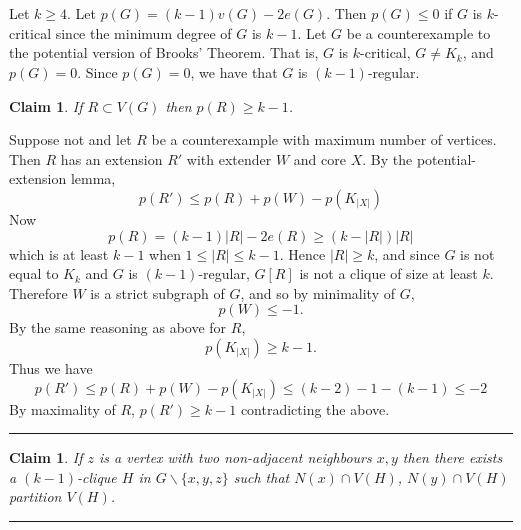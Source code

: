 \documentclass[letterpaper,12pt,oneside,onecolumn]{article}
\newenvironment{proof}{{\bf Proof:  }}{\hfill\rule{2mm}{2mm}}
\newtheorem{claim}[fact]{Claim}
\begin{document}
\section{}
\paragraph{}
Let $k \geq 4$. Let $p(G) = (k-1)v(G) - 2e(G)$. Then $p(G) \leq 0$ if $G$ is $k$-critical since the minimum degree of $G$ is $k-1$. Let $G$ be a counterexample to the potential version of Brooks' Theorem. That is, $G$ is $k$-critical, $G\neq K_k$, and $p(G) = 0$. Since $p(G) = 0$, we have that $G$ is $(k-1)$-regular.
\begin{claim}
If $R \subset V(G)$ then $p(R) \geq k-1$.
\end{claim}
\begin{proof}
Suppose not and let $R$ be a counterexample with maximum number of vertices. Then $R$ has an extension $R'$ with extender $W$ and core $X$. By the potential-extension lemma,
$$p(R') \leq p(R) + p(W) - p(K_{|X|})$$
Now $$p(R) =  (k-1)|R| - 2e(R) \geq (k-|R|)|R|$$
which is at least $k-1$ when $1 \leq |R| \leq k-1$. Hence $|R| \geq k$, and since $G$ is not equal to $K_k$ and $G$ is $(k-1)$-regular, $G[R]$ is not a clique of size at least $k$. Therefore $W$ is a strict subgraph of $G$, and so by minimality of $G$,
$$p(W) \leq -1.$$
By the same reasoning as above for $R$, $$p(K_{|X|}) \geq k-1.$$
Thus we have
$$p(R') \leq p(R) + p(W) - p(K_{|X|}) \leq (k-2)  - 1 -(k-1) \leq - 2$$
By maximality of $R$, $p(R') \geq k-1$ contradicting the above.
\end{proof}
\begin{claim}
If $z$ is a vertex with two non-adjacent neighbours $x,y$ then there exists a $(k-1)$-clique $H$ in $G\backslash \{x,y,z\}$ such that $N(x) \cap V(H)$, $N(y) \cap V(H)$ partition $V(H)$.
\end{claim}
\begin{proof}

\end{proof}
\end{document}
